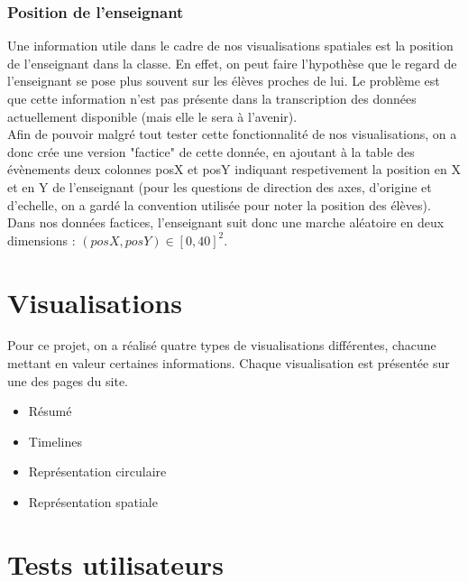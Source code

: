 \documentclass{article}
\begin{document}
\subsubsection{Position de l'enseignant}
Une information utile dans le cadre de nos visualisations spatiales est la position de l'enseignant dans la classe. En effet, on peut faire l'hypothèse que le regard de l'enseignant se pose plus souvent sur les élèves proches de lui. Le problème est que cette information n'est pas présente dans la transcription des données actuellement disponible (mais elle le sera à l'avenir).\\
Afin de pouvoir malgré tout tester cette fonctionnalité de nos visualisations, on a donc crée une version "factice" de cette donnée, en ajoutant à la table des évènements deux colonnes posX et posY indiquant respetivement la position en X et en Y de l'enseignant (pour les questions de direction des axes, d'origine et d'echelle, on a gardé la convention utilisée pour noter la position des élèves). Dans nos données factices, l'enseignant suit donc une marche aléatoire en deux dimensions : $(posX, posY) \in [0, 40]^2$.

\section{Visualisations}
Pour ce projet, on a réalisé quatre types de visualisations différentes, chacune mettant en valeur certaines informations. Chaque visualisation est présentée sur une des pages du site.
\begin{itemize}
    \item Résumé
    \item Timelines
    \item Représentation circulaire
    \item Représentation spatiale
\end{itemize}

\section{Tests utilisateurs}
\end{document}

